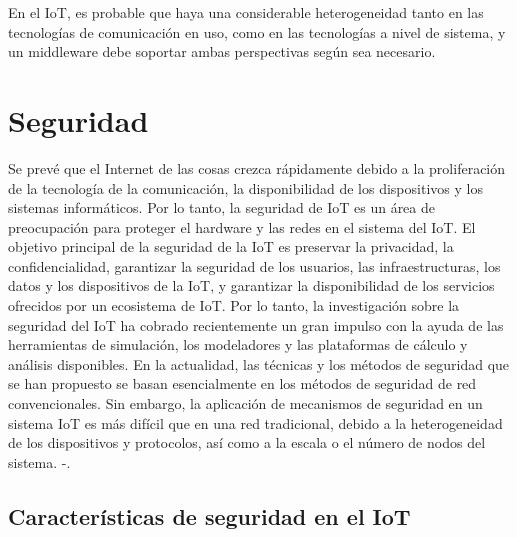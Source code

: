 {En el IoT, es probable que haya una considerable heterogeneidad tanto en las tecnologías de comunicación en uso, como en las tecnologías a nivel de sistema, y un middleware debe soportar ambas perspectivas según sea necesario. 




\section{Seguridad}

Se prevé que el Internet de las cosas crezca rápidamente debido a la proliferación de la tecnología de la comunicación, la disponibilidad de los dispositivos y los sistemas informáticos. Por lo tanto, la seguridad de IoT es un área de preocupación para proteger el hardware y las redes en el sistema del IoT. El objetivo principal de la seguridad de la IoT es preservar la privacidad, la confidencialidad, garantizar la seguridad de los usuarios, las infraestructuras, los datos y los dispositivos de la IoT, y garantizar la disponibilidad de los servicios ofrecidos por un ecosistema de IoT. Por lo tanto, la investigación sobre la seguridad del IoT ha cobrado recientemente un gran impulso con la ayuda de las herramientas de simulación, los modeladores y las plataformas de cálculo y análisis disponibles. En la actualidad, las técnicas y los métodos de seguridad que se han propuesto se basan esencialmente en los métodos de seguridad de red convencionales. Sin embargo, la aplicación de mecanismos de seguridad en un sistema IoT es más difícil que en una red tradicional, debido a la heterogeneidad de los dispositivos y protocolos, así como a la escala o el número de nodos del sistema. \cite{lin2017survey}-\cite{hassan2019current}.

\subsection{Características de seguridad en el IoT}

}
